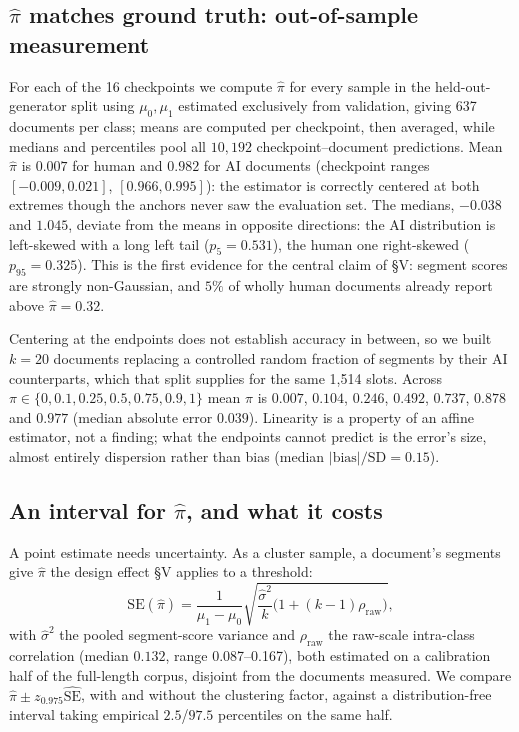 \documentclass[10pt,conference,a4paper]{IEEEtran}
\newcommand{\sect}[1]{\S#1}
\begin{document}
\subsection{$\hat{\pi}$ matches ground truth: out-of-sample measurement}
For each of the 16 checkpoints we compute $\hat{\pi}$ for every sample in
the held-out-generator split using $\mu_0,\mu_1$ estimated exclusively from validation,
giving 637 documents per class; means are computed per checkpoint, then averaged, while
medians and percentiles pool all $10{,}192$ checkpoint--document predictions. Mean
$\hat{\pi}$ is $0.007$ for human and
$0.982$ for AI documents (checkpoint ranges $[-0.009,0.021]$, $[0.966,0.995]$): the
estimator is correctly centered at both extremes though the anchors never saw the
evaluation set. The medians, $-0.038$ and $1.045$, deviate from the means in opposite
directions: the AI distribution is left-skewed with a long left tail ($p_5=0.531$), the
human one right-skewed ($p_{95}=0.325$). This is the first evidence for the central
claim of \sect{V}: segment scores are strongly non-Gaussian, and $5\%$ of wholly human
documents already report above $\hat{\pi}=0.32$.

Centering at the endpoints does not establish accuracy in between, so we built
$k{=}20$ documents replacing a controlled random fraction of segments by their AI
counterparts, which that split supplies for the same 1{,}514 slots.
Across $\pi\in\{0,0.1,0.25,0.5,0.75,0.9,1\}$ mean $\hat{\pi}$ is $0.007$, $0.104$,
$0.246$, $0.492$, $0.737$, $0.878$ and $0.977$ (median absolute error $0.039$).
Linearity is a property of an affine estimator, not a finding; what the endpoints
cannot predict is the error's size, almost entirely dispersion rather than bias
(median $|\text{bias}|/\mathrm{SD}=0.15$).

\subsection{An interval for $\hat{\pi}$, and what it costs}
A point estimate needs uncertainty. As a cluster sample, a document's segments give
$\hat{\pi}$ the design effect \sect{V} applies to a threshold:
\begin{equation}
\widehat{\mathrm{SE}}(\hat{\pi})=\frac{1}{\mu_1-\mu_0}
\sqrt{\frac{\hat{\sigma}^2}{k}\bigl(1+(k-1)\rho_{\text{raw}}\bigr)},
\label{eq:pi-se}
\end{equation}
with $\hat{\sigma}^2$ the pooled segment-score variance and $\rho_{\text{raw}}$ the
raw-scale intra-class correlation (median $0.132$, range 0.087--0.167), both estimated
on a calibration half of the full-length corpus, disjoint from the documents measured.
We compare $\hat{\pi}\pm z_{0.975}\widehat{\mathrm{SE}}$, with and without the clustering
factor, against a distribution-free interval taking empirical $2.5$/$97.5$ percentiles
on the same half.
\end{document}
